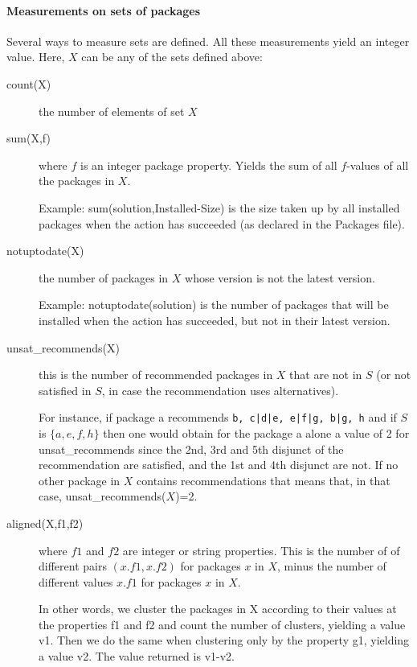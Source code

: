 \paragraph{Measurements on sets of packages}
Several ways to measure sets are defined. All these measurements yield an
integer value. Here, $X$ can be any of the sets defined above:

\begin{description}
\item[count(X)] the number of elements of set $X$
\item[sum(X,f)] where $f$ is an integer package property. Yields the sum
  of all $f$-values of all the packages in $X$.
  
  Example: sum(solution,Installed-Size) is the size taken up by all
  installed packages when the \aptget{} action has succeeded (as declared
  in the Packages file).
\item[notuptodate(X)] the number of packages in $X$ whose version is not the
  latest version.
  
  Example: notuptodate(solution) is the number of packages that will be
  installed when the \aptget{} action has succeeded, but not in their
  latest version.
\item[unsat\_recommends(X)] this is the number of recommended
  packages in $X$ that are not in $S$ (or not satisfied in $S$, in
  case the recommendation uses alternatives).
  
  For instance, if package a recommends \texttt{b, c|d|e, e|f|g,
    b|g, h} and if $S$ is $\{a, e, f, h\}$ then one would obtain for
  the package a alone a value of 2 for unsat\_recommends since the
  2nd, 3rd and 5th disjunct of the recommendation are satisfied, and
  the 1st and 4th disjunct are not. If no other package in \(X\)
  contains recommendations that means that, in that case,
  unsat\_recommends(\(X\))=2.
\item[aligned(X,f1,f2)] where $f1$ and $f2$ are integer or string
  properties. This is the number of of different pairs $(x.f1,x.f2)$ for
  packages $x$ in $X$, minus the number of different values $x.f1$ for
  packages $x$ in $X$.

  In other words, we cluster the packages in X according to their
  values at the properties f1 and f2 and count the number of clusters,
  yielding a value v1. Then we do the same when clustering only by the
  property g1, yielding a value v2. The value returned is v1-v2.
\end{description}

